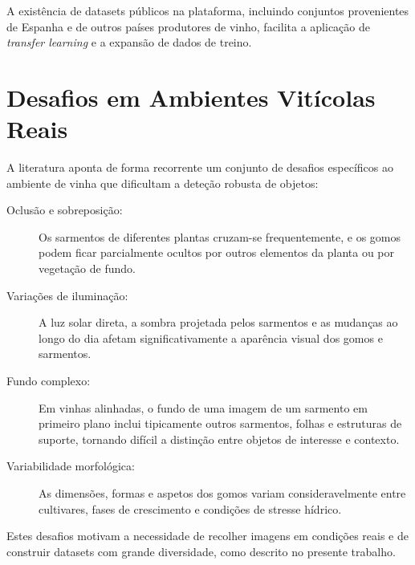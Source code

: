 A existência de datasets públicos na plataforma, incluindo conjuntos
provenientes de Espanha e de outros países produtores de vinho, facilita a
aplicação de \textit{transfer learning} e a expansão de dados de treino.

\section{Desafios em Ambientes Vitícolas Reais}

A literatura aponta de forma recorrente um conjunto de desafios específicos
ao ambiente de vinha que dificultam a deteção robusta de objetos:

\begin{description}
  \item[Oclusão e sobreposição:] Os sarmentos de diferentes plantas cruzam-se
    frequentemente, e os gomos podem ficar parcialmente ocultos por outros
    elementos da planta ou por vegetação de fundo.

  \item[Variações de iluminação:] A luz solar direta, a sombra projetada
    pelos sarmentos e as mudanças ao longo do dia afetam significativamente
    a aparência visual dos gomos e sarmentos.

  \item[Fundo complexo:] Em vinhas alinhadas, o fundo de uma imagem de um
    sarmento em primeiro plano inclui tipicamente outros sarmentos, folhas e
    estruturas de suporte, tornando difícil a distinção entre objetos de
    interesse e contexto.

  \item[Variabilidade morfológica:] As dimensões, formas e aspetos dos gomos
    variam consideravelmente entre cultivares, fases de crescimento e
    condições de stresse hídrico.
\end{description}

Estes desafios motivam a necessidade de recolher imagens em condições reais
e de construir datasets com grande diversidade, como descrito no presente
trabalho.
